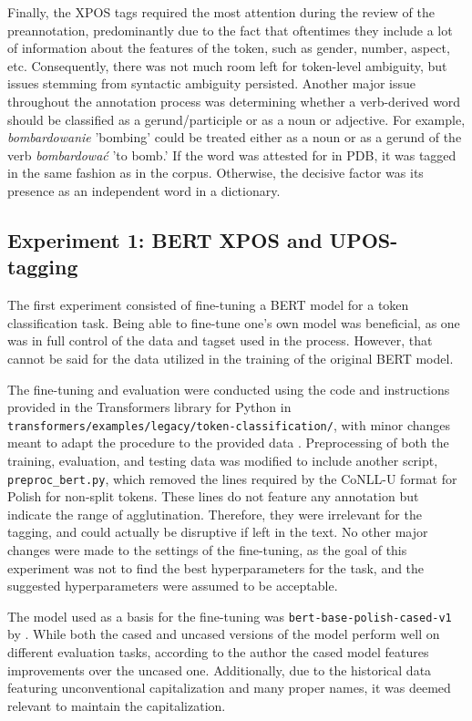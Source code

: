 Finally, the XPOS tags required the most attention during the review of the preannotation, predominantly due to the fact that oftentimes they include a lot of information about the features of the token, such as gender, number, aspect, etc. Consequently, there was not much room left for token-level ambiguity, but issues stemming from syntactic ambiguity persisted. Another major issue throughout the annotation process was determining whether a verb-derived word should be classified as a gerund/participle or as a noun or adjective. For example, \textit{bombardowanie} 'bombing' could be treated either as a noun or as a gerund of the verb \textit{bombardować} 'to bomb.' If the word was attested for in PDB, it was tagged in the same fashion as in the corpus. Otherwise, the decisive factor was its presence as an independent word in a dictionary.  

\subsection{Experiment 1: BERT XPOS and UPOS-tagging}
\label{subsec:bert-tagging}

The first experiment consisted of fine-tuning a BERT model for a token classification task. Being able to fine-tune one's own model was beneficial, as one was in full control of the data and tagset used in the process. However, that cannot be said for the data utilized in the training of the original BERT model. 

The fine-tuning and evaluation were conducted using the code and instructions provided in the Transformers library for Python in \texttt{transformers/examples/legacy/token-classification/}, with minor changes meant to adapt the procedure to the provided data  \citep{wolf-etal-2020-transformers}. Preprocessing of both the training, evaluation, and testing data was modified to include another script, \texttt{preproc\_bert.py}, which removed the lines required by the CoNLL-U format for Polish for non-split tokens. These lines do not feature any annotation but indicate the range of agglutination. Therefore, they were irrelevant for the tagging, and could actually be disruptive if left in the text. No other major changes were made to the settings of the fine-tuning, as the goal of this experiment was not to find the best hyperparameters for the task, and the suggested hyperparameters were assumed to be acceptable.

The model used as a basis for the fine-tuning was \texttt{bert-base-polish-cased-v1} by \citet{kłeczek_2021}. While both the cased and uncased versions of the model perform well on different evaluation tasks, according to the author the cased model features improvements over the uncased one. Additionally, due to the historical data featuring unconventional capitalization and many proper names, it was deemed relevant to maintain the capitalization.

